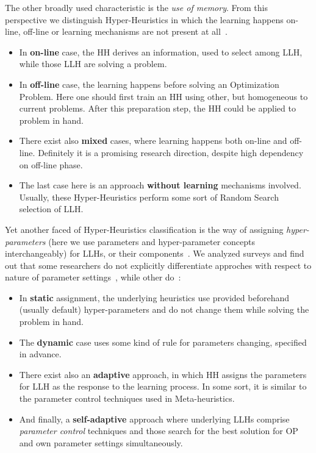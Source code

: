 The other broadly used characteristic is the \textit{use of memory}. From this perspective we distinguish Hyper-Heuristics in which the learning happens on-line, off-line or learning mechanisms are not present at all~\cite{ryser2014review,burke2019classification}.
\begin{itemize}
	\item In \textbf{on-line} case, the HH derives an information, used to select among LLH, while those LLH are solving a problem.

	\item In \textbf{off-line} case, the learning happens before solving an Optimization Problem. Here one should first train an HH using other, but homogeneous to current problems. After this preparation step, the HH could be applied to problem in hand.

	\item There exist also \textbf{mixed} cases, where learning happens both on-line and off-line. Definitely it is a promising research direction, despite high dependency on off-line phase.
	
	\item The last case here is an approach \textbf{without learning} mechanisms involved. Usually, these Hyper-Heuristics perform some sort of Random Search selection of LLH.
\end{itemize}


Yet another faced of Hyper-Heuristics classification is the way of assigning \textit{hyper-parameters} (here we use parameters and hyper-parameter concepts interchangeably) for LLHs, or their components~\cite{drake2019recent}. We analyzed surveys and find out that some researchers do not explicitly differentiate approches with respect to nature of parameter settings~\cite{ryser2014review,burke2013hyper,burke2019classification}, while other do~\cite{drake2019recent}:
\begin{itemize}
	\item In \textbf{static} assignment, the underlying heuristics use provided beforehand (usually default) hyper-parameters and do not change them while solving the problem in hand.

	\item The \textbf{dynamic} case uses some kind of rule for parameters changing, specified in advance.

	\item There exist also an \textbf{adaptive} approach, in which HH assigns the parameters for LLH as the response to the learning process. In some sort, it is similar to the parameter control techniques used in Meta-heuristics.
	
	\item And finally, a \textbf{self-adaptive} approach where underlying LLHs comprise \textit{parameter control} techniques and those search for the best solution for OP and own parameter settings simultaneously.
\end{itemize}


